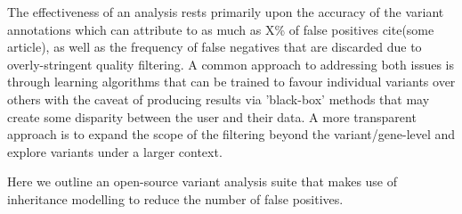 The effectiveness of an analysis rests primarily upon the accuracy of the variant annotations which can attribute to as much as X\% of false positives cite(some article), as well as the frequency of false negatives that are discarded due to overly-stringent quality filtering. A common approach to addressing both issues is through learning algorithms that can be trained to favour individual variants over others with the caveat of producing results via 'black-box' methods that may create some disparity between the user and their data. A more transparent approach is to expand the scope of the filtering beyond the variant/gene-level and explore variants under a larger context.



Here we outline an open-source variant analysis suite that makes use of inheritance modelling to reduce the number of false positives.
